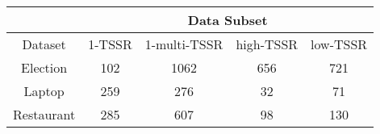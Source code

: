 \begin{tabular}{|c|c|c|c|c|}
\hline
            &  \multicolumn{4}{c|}{Data Subset} \\
\hline 
Dataset &  1-TSSR &  1-multi-TSSR &  high-TSSR &  low-TSSR \\ 
\hline
Election   &     102 &          1062 &        656 &       721 \\
\hline  
Laptop     &     259 &           276 &         32 &        71 \\
\hline  
Restaurant &     285 &           607 &         98 &       130 \\
\hline 
\end{tabular}